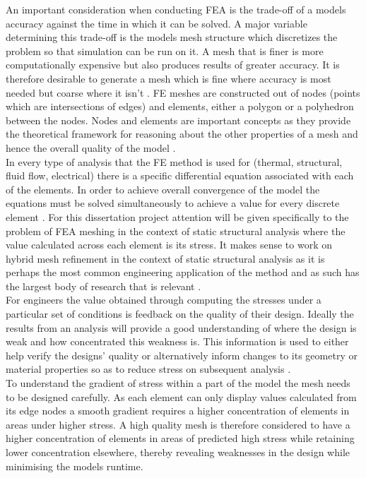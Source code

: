 \documentclass{article}
\begin{document}
\noindent
An important consideration when conducting FEA is the trade-off of a models accuracy against the time in which it can be solved. A major variable determining this trade-off is the models mesh structure which discretizes the problem so that simulation can be run on it. A mesh that is finer is more computationally expensive but also produces results of greater accuracy. It is therefore desirable to generate a mesh which is fine where accuracy is most needed but coarse where it isn't \cite{cite04}. FE meshes are constructed out of nodes (points which are intersections of edges) and elements, either a polygon or a polyhedron between the nodes. Nodes and elements are important concepts as they provide the theoretical framework for reasoning about the other properties of a mesh and hence the overall quality of the model \cite{IntroductionToFE}.\\

\noindent
In every type of analysis that the FE method is used for (thermal, structural, fluid flow, electrical) there is a specific differential equation associated with each of the elements. In order to achieve overall convergence of the model the equations must be solved simultaneously to achieve a value for every discrete element \cite{IntroductionToFE}. For this dissertation project attention will be given specifically to the problem of FEA meshing in the context of static structural analysis where the value calculated across each element is its stress. It makes sense to work on hybrid mesh refinement in the context of static structural analysis as it is perhaps the most common engineering application of the method and as such has the largest body of research that is relevant \cite{DolsakPaper94}\cite{IntroductionToFE}.\\

\noindent
For engineers the value obtained through computing the stresses under a particular set of conditions is feedback on the quality of their design. Ideally the results from an analysis will provide a good understanding of where the design is weak and how concentrated this weakness is. This information is used to either help verify the designs' quality or alternatively inform changes to its geometry or material properties so as to reduce stress on subsequent analysis \cite{cite06}.\\

\noindent
To understand the gradient of stress within a part of the model the mesh needs to be designed carefully. As each element can only display values calculated from its edge nodes a smooth gradient requires a higher concentration of elements in areas under higher stress. A high quality mesh is therefore considered to have a higher concentration of elements in areas of predicted high stress while retaining lower concentration elsewhere, thereby revealing weaknesses in the design while minimising the models runtime.\\
\end{document}

